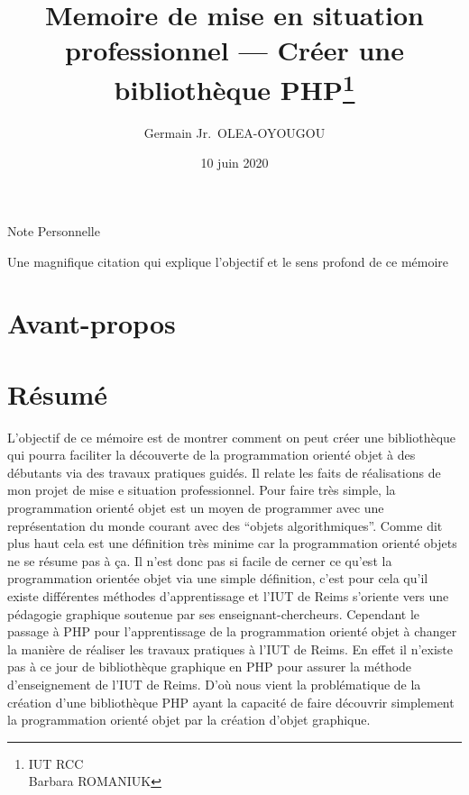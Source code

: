 \documentclass[11pt,a4paper,krantz2,11pt,oneside]{krantz}
\title{Memoire de mise en situation professionnel --- Créer une bibliothèque PHP\thanks{IUT RCC\\
Barbara ROMANIUK}}
\author{Germain Jr.~OLEA-OYOUGOU}
\date{10 juin 2020}
\begin{document}
\maketitle

\thispagestyle{empty}
\begin{center}
\Large{Note Personnelle}

\large{Une magnifique citation qui explique l'objectif et le sens profond de ce mémoire}
\end{center}

\setlength{\abovedisplayskip}{-5pt}
\setlength{\abovedisplayshortskip}{-5pt}

{
\hypersetup{linkcolor=}
\setcounter{tocdepth}{1}
\tableofcontents
}
\listoftables
\listoffigures
\hypertarget{avant-propos}{%
\chapter*{Avant-propos}\label{avant-propos}}


\mainmatter

\hypertarget{ruxe9sumuxe9}{%
\chapter*{Résumé}\label{ruxe9sumuxe9}}


L'objectif de ce mémoire est de montrer comment on peut créer une bibliothèque qui pourra faciliter la découverte de la programmation orienté objet à des débutants via des travaux pratiques guidés. Il relate les faits de réalisations de mon projet de mise e situation professionnel. Pour faire très simple, la programmation orienté objet est un moyen de programmer avec une représentation du monde courant avec des ``objets algorithmiques''. Comme dit plus haut cela est une définition très minime car la programmation orienté objets ne se résume pas à ça. Il n'est donc pas si facile de cerner ce qu'est la programmation orientée objet via une simple définition, c'est pour cela qu'il existe différentes méthodes d'apprentissage et l'IUT de Reims s'oriente vers une pédagogie graphique soutenue par ses enseignant-chercheurs. Cependant le passage à PHP pour l'apprentissage de la programmation orienté objet à changer la manière de réaliser les travaux pratiques à l'IUT de Reims. En effet il n'existe pas à ce jour de bibliothèque graphique en PHP pour assurer la méthode d'enseignement de l'IUT de Reims. D'où nous vient la problématique de la création d'une bibliothèque PHP ayant la capacité de faire découvrir simplement la programmation orienté objet par la création d'objet graphique.
\end{document}
